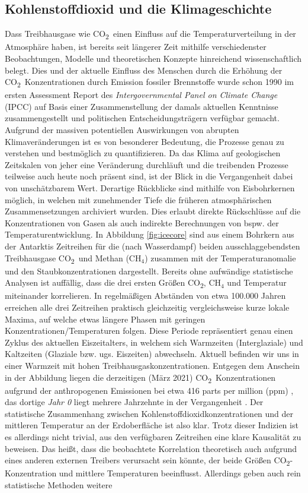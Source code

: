 \documentclass[12pt,a4paper,onecolumn]{scrartcl}
\newcommand{\cotwo}{CO\textsubscript{2}}
\begin{document}
\subsection{Kohlenstoffdioxid und die Klimageschichte} \label{sec:Klima}
Dass Treibhausgase wie \cotwo \ einen Einfluss auf die Temperaturverteilung in der Atmosphäre haben, ist bereits seit längerer Zeit mithilfe verschiedenster Beobachtungen, Modelle und theoretischen Konzepte hinreichend wissenschaftlich belegt. Dies und der aktuelle Einfluss des Menschen durch die Erhöhung der \cotwo \ Konzentrationen durch Emission fossiler Brennstoffe wurde schon 1990 im ersten Assessment Report des \textit{Intergovernmental Panel on Climate Change} (IPCC) auf Basis einer Zusammenstellung der damals aktuellen Kenntnisse zusammengestellt und politischen Entscheidungsträgern verfügbar gemacht. Aufgrund der massiven potentiellen Auswirkungen von abrupten Klimaveränderungen \citep{IPCCpol.2018} ist es von besonderer Bedeutung, die Prozesse genau zu verstehen und bestmöglich zu quantifizieren. Da das Klima auf geologischen Zeitskalen von jeher eine Veränderung durchläuft und die  treibenden Prozesse teilweise auch heute noch präsent sind, ist der Blick in die Vergangenheit dabei von unschätzbarem Wert. Derartige Rückblicke sind mithilfe von Eisbohrkernen möglich, in welchen mit zunehmender Tiefe die früheren atmosphärischen Zusammensetzungen archiviert wurden. Dies erlaubt direkte Rückschlüsse auf die Konzentrationen von Gasen als auch indirekte Berechnungen von bspw. der Temperaturentwicklung. In Abbildung \ref{fig:icecore} sind aus einem Bohrkern aus der Antarktis Zeitreihen für die (nach Wasserdampf) beiden ausschlaggebendsten Treibhausgase \cotwo \ und Methan (CH$_4$) zusammen mit der Temperaturanomalie und den Staubkonzentrationen dargestellt. Bereits ohne aufwändige statistische Analysen ist auffällig, dass die drei ersten Größen \cotwo , CH$_4$ und Temperatur miteinander korrelieren. In regelmäßigen Abständen von etwa 100.000 Jahren erreichen alle drei Zeitreihen praktisch gleichzeitig vergleichsweise kurze lokale Maxima, auf welche etwas längere Phasen mit geringen Konzentrationen/Temperaturen folgen. Diese Periode repräsentiert genau einen Zyklus des aktuellen Eiszeitalters, in welchem sich Warmzeiten (Interglaziale) und Kaltzeiten (Glaziale bzw. ugs. Eiszeiten) abwechseln. Aktuell befinden wir uns in einer Warmzeit mit hohen Treibhausgaskonzentrationen. Entgegen dem Anschein in der Abbildung liegen die derzeitigen (März 2021) \cotwo \ Konzentrationen aufgrund der anthropogenen Emissionen bei etwa 416 parts per million (ppm) \citep{NASA.06.05.2021}, das dortige \textit{Jahr 0} liegt mehrere Jahrzehnte in der Vergangenheit \citep{Luthi.2008}. Der statistische Zusammenhang zwischen Kohlenstoffdioxidkonzentrationen und der mittleren Temperatur an der Erdoberfläche ist also klar.  Trotz dieser Indizien ist es allerdings nicht trivial, aus den verfügbaren Zeitreihen eine klare Kausalität zu beweisen. Das heißt, dass die beobachtete Korrelation theoretisch auch aufgrund eines anderen externen Treibers verursacht sein könnte, der beide Größen \cotwo -Konzentration und mittlere Temperaturen beeinflusst. Allerdings geben auch rein statistische Methoden \citep{Stips.2016} weitere 
\end{document}
